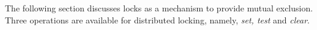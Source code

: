 The following section discusses \openshmem locks as a mechanism to provide mutual exclusion. Three operations are available for distributed locking, namely, \textit{set, test} and  \textit{clear}.